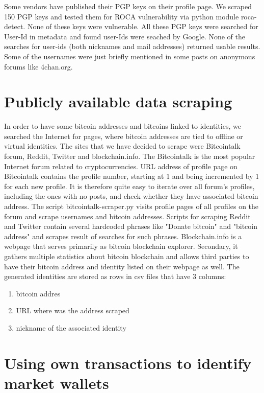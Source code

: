 \documentclass[
  digital, %
  table,   %
  lof,     %
  lot,     %
  oneside
]{fithesis3}
\begin{document}
Some vendors have published their PGP keys on their profile page.
We scraped 150 PGP keys and tested them for ROCA vulnerability via python module roca-detect. None of these keys were vulnerable.
All these PGP keys were searched for User-Id in metadata and found user-Ids were seached by Google.
None of the searches for user-ids (both nicknames and mail addresses) returned usable results.
Some of the usernames were just briefly mentioned in some posts on anonymous forums like 4chan.org.

\section{Publicly available data scraping}
\label{Publicly available data scraping}

In order to have some bitcoin addresses and bitcoins linked to identities,
we searched the Internet for pages, where bitcoin addresses are tied to offline or virtual identities.
The sites that we have decided to scrape were Bitcointalk forum, Reddit, Twitter and blockchain.info.
The Bitcointalk is the most popular Internet forum
related to cryptocurrencies. URL address of profile page on Bitcointalk
contains the profile number, starting at 1 and being incremented by 1
for each new profile. It is therefore quite easy to iterate over all forum's profiles,
including the ones with no posts, and check whether they have associated bitcoin address.
The script bitcointalk-scraper.py visits profile pages of all profiles on the forum and scrape usernames and bitcoin addresses. 
Scripts for scraping Reddit and Twitter contain several hardcoded phrases like "Donate bitcoin" and "bitcoin address" and scrapes 
result of searches for such phrases.
Blockchain.info is a webpage that serves primarily as bitcoin blockchain explorer. Secondary,
it gathers multiple statistics about bitcoin blockchain and allows
third parties to have their bitcoin address and identity listed on their webpage as well.
The generated identities are stored as rows in csv files that have 3 columns:

\begin{enumerate}
 \item bitcoin addres
 \item URL where was the address scraped
 \item nickname of the associated identity
\end{enumerate}



\section{Using own transactions to identify market wallets}
\label{Using own transactions to identify market wallets}
\end{document}
